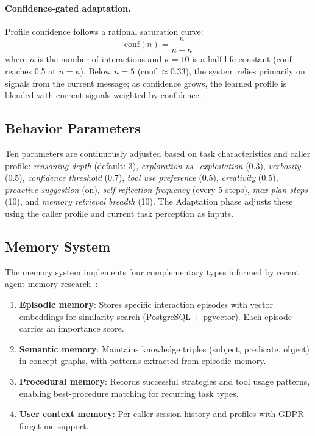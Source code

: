 \documentclass{article}
\begin{document}
\paragraph{Confidence-gated adaptation.}
Profile confidence follows a rational saturation curve:
\begin{equation}
  \text{conf}(n) = \frac{n}{n + \kappa}
\label{eq:confidence}
\end{equation}
where $n$ is the number of interactions and $\kappa = 10$ is a half-life constant (conf reaches 0.5 at $n = \kappa$). Below $n = 5$ (conf $\approx 0.33$), the system relies primarily on signals from the current message; as confidence grows, the learned profile is blended with current signals weighted by confidence.

\subsection{Behavior Parameters}

Ten parameters are continuously adjusted based on task characteristics and caller profile: \emph{reasoning depth} (default: 3), \emph{exploration vs.\ exploitation} (0.3), \emph{verbosity} (0.5), \emph{confidence threshold} (0.7), \emph{tool use preference} (0.5), \emph{creativity} (0.5), \emph{proactive suggestion} (on), \emph{self-reflection frequency} (every 5 steps), \emph{max plan steps} (10), and \emph{memory retrieval breadth} (10). The Adaptation phase adjusts these using the caller profile and current task perception as inputs.

\subsection{Memory System}

The memory system implements four complementary types informed by recent agent memory research~\citep{ai2025memorybench, gallego2026memoryastool}:

\begin{enumerate}
\item \textbf{Episodic memory}: Stores specific interaction episodes with vector embeddings for similarity search (PostgreSQL + pgvector). Each episode carries an importance score.
\item \textbf{Semantic memory}: Maintains knowledge triples (subject, predicate, object) in concept graphs, with patterns extracted from episodic memory.
\item \textbf{Procedural memory}: Records successful strategies and tool usage patterns, enabling best-procedure matching for recurring task types.
\item \textbf{User context memory}: Per-caller session history and profiles with GDPR forget-me support.
\end{enumerate}
\end{document}
